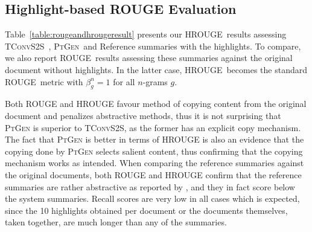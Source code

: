 \documentclass[11pt,a4paper]{article}
\newcommand\ptgen{\textsc{PtGen}}
\newcommand\tconv{\textsc{TConvS2S}}
\newcommand\hrouge{\textsc{HROUGE}}
\newcommand\rouge{\textsc{ROUGE}}
\begin{document}
\subsection{Highlight-based \rouge{} Evaluation} 

Table~\ref{table:rougeandhrougeresult} presents our \hrouge\ results assessing \tconv\ , \ptgen\  and Reference summaries with the highlights. To compare, we also report \rouge\ results assessing these summaries against the original document without highlights. In the latter case, \hrouge\ becomes the standard \rouge\ metric with $\beta^n_g=1$ for all $n$-grams $g$. 

Both \rouge{} and \hrouge{} favour method of copying content from the original document and penalizes abstractive methods, thus it is not surprising that \ptgen{} is superior to \tconv{}, as the former has an explicit copy mechanism. The fact that \ptgen{} is better in terms of \hrouge{} is also an evidence that the copying done by \ptgen{} selects salient content, thus confirming that the copying mechanism works as intended. 
When comparing the reference summaries against the original documents, both \rouge{} and \hrouge{} confirm that the reference summaries are rather abstractive as reported by \citet{narayan18xsum}, and they in fact score below the system summaries. 
Recall scores are very low in all cases which is expected, since the 10 highlights obtained per document or the documents themselves, taken together, are much longer than any of the summaries.
\end{document}
